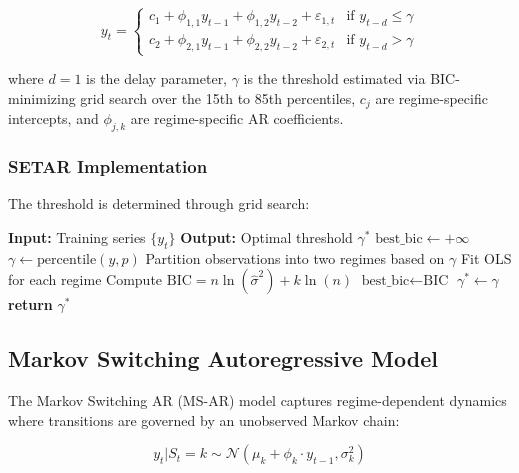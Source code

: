 \documentclass[12pt]{report}
\begin{document}
\begin{equation}
y_t = \begin{cases}
c_1 + \phi_{1,1} y_{t-1} + \phi_{1,2} y_{t-2} + \varepsilon_{1,t} & \text{if } y_{t-d} \leq \gamma \\
c_2 + \phi_{2,1} y_{t-1} + \phi_{2,2} y_{t-2} + \varepsilon_{2,t} & \text{if } y_{t-d} > \gamma
\end{cases}
\end{equation}

where $d=1$ is the delay parameter, $\gamma$ is the threshold estimated via BIC-minimizing grid search over the 15th to 85th percentiles, $c_j$ are regime-specific intercepts, and $\phi_{j,k}$ are regime-specific AR coefficients.

\subsubsection{SETAR Implementation}

The threshold is determined through grid search:

\begin{algorithm}[H]
\caption{SETAR Threshold Selection}
\begin{algorithmic}[1]
\State \textbf{Input:} Training series $\{y_t\}$
\State \textbf{Output:} Optimal threshold $\gamma^*$
\State $\text{best\_bic} \leftarrow +\infty$
    \State $\gamma \leftarrow \text{percentile}(y, p)$
    \State Partition observations into two regimes based on $\gamma$
    \State Fit OLS for each regime
    \State Compute $\text{BIC} = n \ln(\hat{\sigma}^2) + k \ln(n)$
        \State $\text{best\_bic} \leftarrow \text{BIC}$
        \State $\gamma^* \leftarrow \gamma$
    \EndIf
\EndFor
\State \textbf{return} $\gamma^*$
\end{algorithmic}
\end{algorithm}

\subsection{Markov Switching Autoregressive Model}

The Markov Switching AR (MS-AR) model captures regime-dependent dynamics where transitions are governed by an unobserved Markov chain:

\begin{equation}
y_t | S_t = k \sim \mathcal{N}\left(\mu_k + \phi_k \cdot y_{t-1}, \sigma_k^2\right)
\end{equation}
\end{document}

